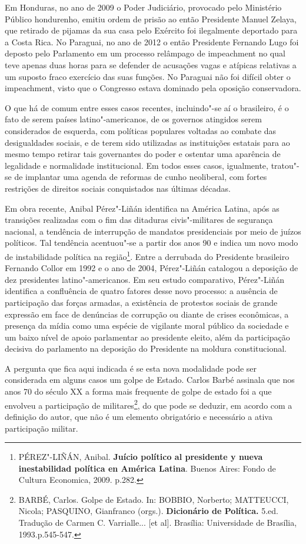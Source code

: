 Em Honduras, no ano de 2009 o Poder Judiciário, provocado pelo
Ministério Público hondurenho, emitiu ordem de prisão ao então
Presidente Manuel Zelaya, que retirado de pijamas da sua casa pelo
Exército foi ilegalmente deportado para a Costa Rica. No Paraguai, no
ano de 2012 o então Presidente Fernando Lugo foi deposto pelo Parlamento
em um processo relâmpago de impeachment no qual teve apenas duas horas
para se defender de acusações vagas e atípicas relativas a um suposto
fraco exercício das suas funções. No Paraguai não foi difícil obter o
impeachment, visto que o Congresso estava dominado pela oposição
conservadora.

O que há de comum entre esses casos recentes, incluindo"-se aí o
brasileiro, é o fato de serem países latino"-americanos, de os governos
atingidos serem considerados de esquerda, com políticas populares
voltadas ao combate das desigualdades sociais, e de terem sido
utilizadas as instituições estatais para ao mesmo tempo retirar tais
governantes do poder e ostentar uma aparência de legalidade e
normalidade institucional. Em todos esses casos, igualmente, tratou"-se
de implantar uma agenda de reformas de cunho neoliberal, com fortes
restrições de direitos sociais conquistados nas últimas décadas.

Em obra recente, Anibal Pérez"-Liñán identifica na América Latina, após
as transições realizadas com o fim das ditaduras civis"-militares de
segurança nacional, a tendência de interrupção de mandatos presidenciais
por meio de juízos políticos. Tal tendência acentuou"-se a partir dos
anos 90 e indica um novo modo de instabilidade política na
região\footnote{PÉREZ"-LIÑÁN, Anibal. \textbf{Juício político al
  presidente y nueva inestabilidad política en América Latina}. Buenos
  Aires: Fondo de Cultura Economica, 2009. p.282.}. Entre a derrubada do
Presidente brasileiro Fernando Collor em 1992 e o ano de 2004,
Pérez"-Liñán catalogou a deposição de dez presidentes latino"-americanos.
Em seu estudo comparativo, Pérez"-Liñán identifica a confluência de
quatro fatores desse novo processo: a ausência de participação das
forças armadas, a existência de protestos sociais de grande expressão em
face de denúncias de corrupção ou diante de crises econômicas, a
presença da mídia como uma espécie de vigilante moral público da
sociedade e um baixo nível de apoio parlamentar ao presidente eleito,
além da participação decisiva do parlamento na deposição do Presidente
na moldura constitucional.

A pergunta que fica aqui indicada é se esta nova modalidade pode ser
considerada em alguns casos um golpe de Estado. Carlos Barbé assinala
que nos anos 70 do século XX a forma mais frequente de golpe de estado
foi a que envolveu a participação de militares\footnote{BARBÉ, Carlos.
  Golpe de Estado. In: BOBBIO, Norberto; MATTEUCCI, Nicola; PASQUINO,
  Gianfranco (orgs.). \textbf{Dicionário de Política.} 5.ed. Tradução de
  Carmen C. Varrialle... {[}et al{]}. Brasília: Universidade de
  Brasília, 1993.p.545-547.}, do que pode se deduzir, em acordo com a
definição do autor, que não é um elemento obrigatório e necessário a
ativa participação militar.

